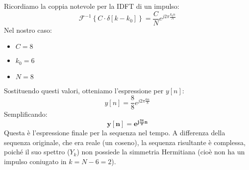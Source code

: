 \begin{soluzione}{19}
    Ricordiamo la coppia notevole per la IDFT di un impulso:
    \[
        \mathcal{F}^{-1}\left\{ C \cdot \delta[k-k_0] \right\} = \frac{C}{N} e^{j2\pi\frac{k_0 n}{N}}
    \]
    Nel nostro caso:
    \begin{itemize}
        \item $C = 8$
        \item $k_0 = 6$
        \item $N = 8$
    \end{itemize}
    Sostituendo questi valori, otteniamo l'espressione per $y[n]$:
    \[
        y[n] = \frac{8}{8} e^{j2\pi\frac{6n}{8}}
    \]
    Semplificando:
    \[
        \mathbf{y[n] = e^{j\frac{3\pi}{2}n}}
    \]
    Questa è l'espressione finale per la sequenza nel tempo. A differenza della sequenza originale, che era reale (un coseno), la sequenza risultante è complessa, poiché il suo spettro ($Y_k$) non possiede la simmetria Hermitiana (cioè non ha un impulso coniugato in $k=N-6=2$).
    
\end{soluzione}